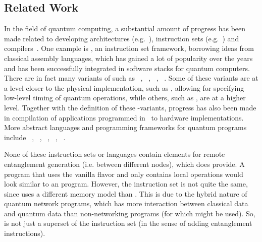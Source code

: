 \subsection{Related Work}
\label{sec:related}
In the field of quantum computing, a substantial amount of progress has been made related to developing
architectures (e.g.~\cite{fu2017microarchitecture,bourassa2020photonicblueprint, murali2019fullstack, wecker2014liqui, khammassi2020openql, amy2019staq, green2013quipper, Steiger2016}),
instruction sets (e.g.~\cite{cross2017openqasm,khammassi2018cqasm,fu2019eqasm,liu2017fqasm,smith2016quil,qiskit,cirq,qsharp,jones2019quest}) and
compilers~\cite{zulehner2019compiling, haner2018software, gokhale2020quantum, liu2020new, gokhale2020optimized, ding2020square, smith2020opensource, Sivarajah_2020, hietala2019verified, zhang2020contextmapping, niu2020hardware, dury2020qubo, pozzi2020using, Nishio_2020}.
One example is \qasm, an instruction set framework, borrowing ideas from classical assembly languages, which has gained a lot of popularity over the years and has been successfully integrated in software stacks for quantum computers.
There are in fact many variants of \qasm such as \openqasm~\cite{cross2017openqasm}, ~\cite{khammassi2018cqasm}, ~\cite{fu2019eqasm}, ~\cite{liu2017fqasm}.
Some of these variants are at a level closer to the physical implementation, such as , allowing for specifying low-level timing of quantum operations, while others, such as , are at a higher level.
Together with the definition of these \qasm-variants, progress has also been made in compilation of applications programmed in \qasm\ to hardware implementations.
More abstract languages and programming frameworks for quantum programs include ~\cite{smith2016quil}, ~\cite{qiskit}, ~\cite{cirq}, ~\cite{qsharp}, ~\cite{jones2019quest}.

None of these instruction sets or languages contain elements for remote entanglement generation (i.e. between different nodes), which \netqasm does provide.
A \netqasm program that uses the vanilla flavor and only contains local operations would look similar to an \openqasm program.
However, the instruction set is not quite the same, since \netqasm uses a different memory model than \openqasm.
This is due to the hybrid nature of quantum network programs, which has more interaction between classical data and quantum data than non-networking programs (for which \openqasm might be used).
So, \netqasm is not just a superset of the \openqasm instruction set (in the sense of adding entanglement instructions).


